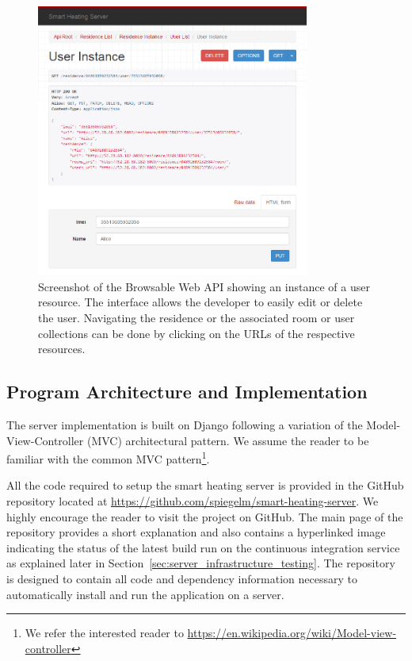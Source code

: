 \begin{figure}[h]
	\begin{center}
		\includegraphics[width=0.8\textwidth]{images/server_browable_api_user_instance.png}
	\end{center}
	\caption{Screenshot of the Browsable Web API showing an instance of a user resource. The interface allows the developer to easily edit or delete the user. Navigating the residence or the associated room or user collections can be done by clicking on the URLs of the respective resources.}
	\label{fig:server_infrastructure_browsable_api}
\end{figure}


\subsection{Program Architecture and Implementation}
\label{sec:server_infrastructure_program_architecture_implementation}

The server implementation is built on Django following a variation
of the Model-View-Controller (MVC) architectural pattern.
We assume the reader to be familiar with the common MVC pattern\footnote{We refer the interested reader to \url{https://en.wikipedia.org/wiki/Model-view-controller}}.

All the code required to setup the smart heating server is provided in the GitHub repository located at \url{https://github.com/spiegelm/smart-heating-server}.
We highly encourage the reader to visit the project on GitHub.
The main page of the repository provides a short explanation and also contains a hyperlinked image indicating the status of the latest build run on the continuous integration service as explained later in Section~\ref{sec:server_infrastructure_testing}.
The repository is designed to contain all code and dependency information necessary to automatically install and run the application on a server.

